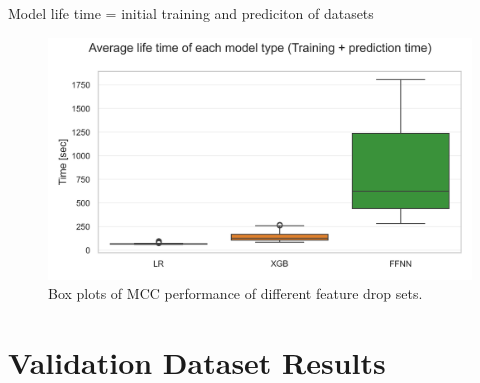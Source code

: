 Model life time = initial training and prediciton of datasets
\begin{figure}[ht]
    \centering
    \includegraphics[width = .6\textwidth]{pictures/feature_filter/life_time_models.png}
    \caption{Box plots of MCC performance of different feature drop sets.}
    \label{fig:lifetime_model}
\end{figure}

\clearpage

\section{Validation Dataset Results}
\label{app:se:validation_results}

